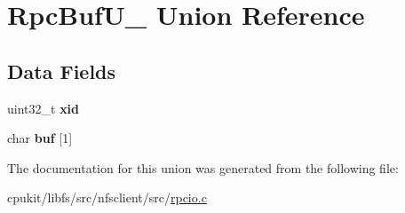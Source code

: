\hypertarget{unionRpcBufU__}{}\section{Rpc\+Buf\+U\+\_\+ Union Reference}
\label{unionRpcBufU__}
\subsection*{Data Fields}
\begin{DoxyCompactItemize}
\item 
\mbox{\label{unionRpcBufU___aa918c45efd615f1c9f4386b304e3bf64}} 
uint32\+\_\+t {\bfseries xid}
\item 
\mbox{\label{unionRpcBufU___a60191153cf37a3f455707562366ef98f}} 
char {\bfseries buf} \mbox{[}1\mbox{]}
\end{DoxyCompactItemize}


The documentation for this union was generated from the following file\+:\begin{DoxyCompactItemize}
\item 
cpukit/libfs/src/nfsclient/src/\mbox{\hyperlink{rpcio_8c}{rpcio.\+c}}\end{DoxyCompactItemize}

